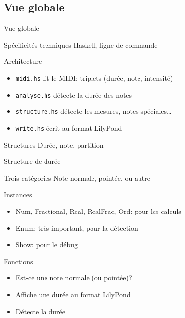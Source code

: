 \documentclass{beamer}
\begin{document}
\subsection{Vue globale}

\begin{frame}[containsverbatim]{Vue globale}
\begin{block}{Spécificités techniques}
    Haskell, ligne de commande
\end{block}
\begin{block}{Architecture}
    \begin{itemize}
        \item \verb+midi.hs+ lit le MIDI: triplets (durée, note, intensité)
        \item \verb+analyse.hs+ détecte la durée des notes
        \item \verb+structure.hs+ détecte les mesures, notes spéciales…
        \item \verb+write.hs+ écrit au format LilyPond
    \end{itemize}
\end{block}
\begin{block}{Structures}
    Durée, note, partition
\end{block}
\end{frame}

\begin{frame}{Structure de durée}
    \begin{block}{Trois catégories}
        Note normale, pointée, ou autre
    \end{block}
    \begin{block}{Instances}
        \begin{itemize}
            \item Num, Fractional, Real, RealFrac, Ord: pour les calculs
            \item Enum: très important, pour la détection
            \item Show: pour le débug
        \end{itemize}
    \end{block}
    \begin{block}{Fonctions}
        \begin{itemize}
            \item Est-ce une note normale (ou pointée)?
            \item Affiche une durée au format LilyPond
            \item Détecte la durée
        \end{itemize}
    \end{block}
\end{frame}
\end{document}
